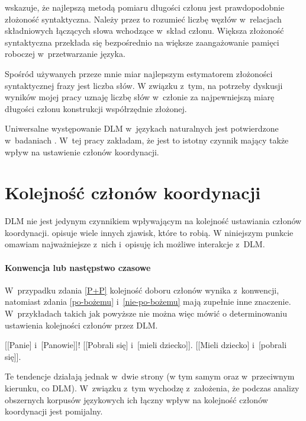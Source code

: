 \cite{lohmann2014english} wskazuje, że najlepszą metodą pomiaru długości członu jest prawdopodobnie złożoność syntaktyczna. Należy przez to rozumieć liczbę węzłów w~relacjach składniowych łączących słowa wchodzące w~skład członu. Większa złożoność syntaktyczna przekłada się bezpośrednio na większe zaangażowanie pamięci roboczej w~przetwarzanie języka. 

Spośród używanych przeze mnie miar najlepszym estymatorem złożoności syntaktycznej frazy jest liczba słów. W związku z~tym, na potrzeby dyskusji wyników mojej pracy uznaję liczbę słów w~członie za najpewniejszą miarę długości członu konstrukcji współrzędnie złożonej.

Uniwersalne występowanie DLM w~językach naturalnych jest potwierdzone w~badaniach \citep{futrell2015large}. W~tej pracy zakładam, że jest to istotny czynnik mający także wpływ na ustawienie członów koordynacji. 

\section{Kolejność członów koordynacji} \label{kolejność}

DLM nie jest jedynym czynnikiem wpływającym na kolejność ustawiania członów koordynacji.
\cite{lohmann2014english} opisuje wiele innych zjawisk, które to robią. W niniejszym punkcie omawiam najważniejsze z~nich i~opisuję ich możliwe interakcje z~DLM.

\paragraph{Konwencja lub następstwo czasowe}

W~przypadku zdania \eqref{P+P} kolejność doboru członów wynika z~konwencji, natomiast zdania \eqref{po-bożemu} i~\eqref{nie-po-bożemu} mają zupełnie inne znaczenie. W~przykładach takich jak powyższe nie można więc mówić o determinowaniu ustawienia kolejności członów przez DLM. 

\begin{exe}
\ex \label{P+P} {[[Panie] i~[Panowie]]!}
\ex \label{po-bożemu} {[[Pobrali się] i~[mieli dziecko]].} %
\ex \label{nie-po-bożemu} {[[Mieli dziecko] i~[pobrali się]].}
\end{exe}

Te tendencje działają jednak w~dwie strony (w tym samym oraz w~przeciwnym kierunku, co DLM). W~związku z~tym wychodzę z~założenia, że podczas analizy obszernych korpusów językowych ich łączny wpływ na kolejność członów koordynacji jest pomijalny.

